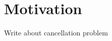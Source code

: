 
\NewPage
\chapter{Motivation}
\label{chap:motivation}

\thispagestyle{empty}
\newpage

Write about cancellation problem